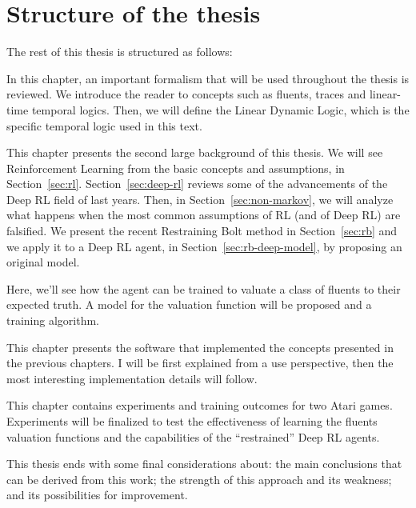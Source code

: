 \section{Structure of the thesis}

The rest of this thesis is structured as follows:
\begin{description}[style=nextline]
	\item[\ref{ch:logics}~--~\nameref{ch:logics}]
		In this chapter, an important formalism that will be used throughout the
		thesis is reviewed. We introduce the reader to concepts such as fluents,
		traces and linear-time temporal logics. Then, we will define the Linear
		Dynamic Logic, which is the specific temporal logic used in this text.
	\item[\ref{ch:rl}~--~\nameref{ch:rl}]
		This chapter presents the second large background of this thesis.  We will
		see Reinforcement Learning from the basic concepts and assumptions, in
		Section~\ref{sec:rl}. Section~\ref{sec:deep-rl} reviews some of the
		advancements of the Deep RL field of last years. Then, in
		Section~\ref{sec:non-markov}, we will analyze what happens when the most
		common assumptions of RL (and of Deep RL) are falsified.
		We present the recent Restraining Bolt method in Section~\ref{sec:rb} and
		we apply it to a Deep RL agent, in Section~\ref{sec:rb-deep-model}, by
		proposing an original model.
	\item[\ref{ch:fluents}~--~\nameref{ch:fluents}]
		Here, we'll see how the agent can be trained to valuate a class of fluents
		to their expected truth. A model for the valuation function will be
		proposed and a training algorithm.
	\item[\ref{ch:atarieyes}~--~\nameref{ch:atarieyes}]
		This chapter presents the software that implemented the concepts presented
		in the previous chapters. I will be first explained from a use
		perspective, then the most interesting implementation details will follow.
	\item[\ref{ch:experiments}~--~\nameref{ch:experiments}]
		This chapter contains experiments and training outcomes for two Atari
		games. Experiments will be finalized to test the effectiveness of learning
		the fluents valuation functions and the capabilities of the ``restrained''
		Deep RL agents.
	\item[\ref{ch:conclusions}~--~\nameref{ch:conclusions}]
		This thesis ends with some final considerations about: the main
		conclusions that can be derived from this work; the strength of this
		approach and its weakness; and its possibilities for improvement.
\end{description}

